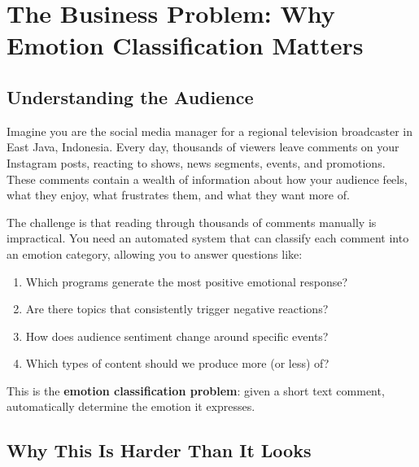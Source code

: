 \documentclass[12pt,a4paper,twoside]{article}
\theoremstyle{definition}
\begin{document}
\newpage
\tableofcontents
\newpage

\section{The Business Problem: Why Emotion Classification Matters}
\label{sec:business}

\subsection{Understanding the Audience}

Imagine you are the social media manager for a regional television broadcaster in East Java, Indonesia. Every day, thousands of viewers leave comments on your Instagram posts, reacting to shows, news segments, events, and promotions. These comments contain a wealth of information about how your audience feels, what they enjoy, what frustrates them, and what they want more of.

The challenge is that reading through thousands of comments manually is impractical. You need an automated system that can classify each comment into an emotion category, allowing you to answer questions like:

\begin{enumerate}[leftmargin=2em]
    \item Which programs generate the most positive emotional response?
    \item Are there topics that consistently trigger negative reactions?
    \item How does audience sentiment change around specific events?
    \item Which types of content should we produce more (or less) of?
\end{enumerate}

This is the \textbf{emotion classification problem}: given a short text comment, automatically determine the emotion it expresses.

\subsection{Why This Is Harder Than It Looks}
\end{document}

